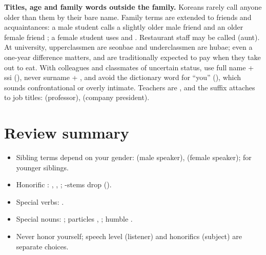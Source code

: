 \begin{aside}
\textbf{Titles, age and family words outside the family.} Koreans rarely call anyone
older than them by their bare name. Family terms are extended to friends and
acquaintances: a male student calls a slightly older male friend  and an older
female friend ; a female student uses  and . Restaurant staff
may be called  (aunt). At university, upperclassmen are  seonbae and
underclassmen are  hubae; even a one-year difference matters, and  are
traditionally expected to pay when they take  out to eat. With colleagues and
classmates of uncertain status, use full name +  ssi (), never
surname + , and avoid the dictionary word for ``you'' (), which sounds
confrontational or overly intimate. Teachers are , and the suffix 
attaches to job titles:  (professor),  (company president).
\end{aside}

\section*{Review summary}
\begin{itemize}
  \item Sibling terms depend on your gender:  (male speaker),
         (female speaker);  for younger siblings.
  \item Honorific : , , ;
        -stems drop  ().
  \item Special verbs: .
  \item Special nouns: ; particles ,
        ; humble .
  \item Never honor yourself; speech level (listener) and honorifics (subject) are
        separate choices.
\end{itemize}
